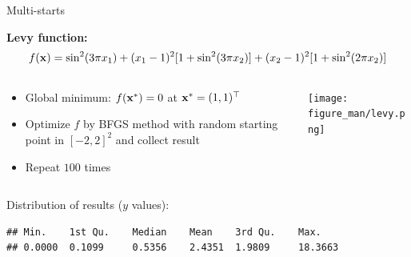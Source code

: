 \documentclass[11pt,compress,t,notes=noshow, xcolor=table]{beamer}
\begin{document}
\begin{vbframe}{Multi-starts}

\footnotesize

\textbf{Levy function:}
\begin{equation*}
    f(\mathbf{x}) = \sin^2(3\pi x_1) + (x_1 - 1)^2 [1 + \sin^2(3\pi x_2)] + (x_2 -1)^2[1 + \sin^2(2\pi x_2)]
\end{equation*}

\vspace{-\baselineskip}

\begin{columns}
\begin{column}[c]{0.5\textwidth}
   \footnotesize
  \vspace{-0.2cm}
  \begin{itemize}
    \item Global minimum: $f(\mathbf{x}^*) = 0$ at $\mathbf{x}^* = (1,1)^\top$
    \item Optimize $f$ by BFGS method with random starting point in $[-2,2]^2$ and collect result
    \item Repeat $100$ times
    \end{itemize}
\end{column}
\begin{column}[c]{0.5\textwidth}
    \begin{center}
  \texttt{[image: figure\_man/levy.png]}
  \end{center}
\end{column}
\end{columns}

Distribution of results ($y$ values):
\vspace{0.1cm}

\footnotesize
\begin{verbatim}
## Min.    1st Qu.    Median    Mean    3rd Qu.    Max.
## 0.0000  0.1099     0.5356    2.4351  1.9809     18.3663
\end{verbatim}









\end{vbframe}
\end{document}
